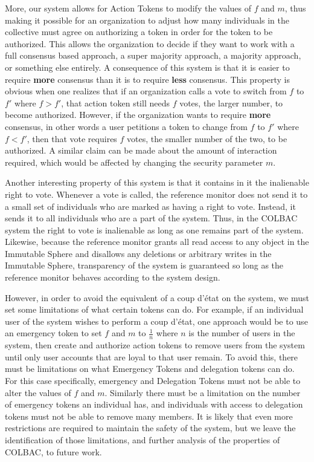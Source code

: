 More, our system allows for Action Tokens to modify the values of $f$ and $m$,
thus making it possible for an organization to adjust how many individuals in
the collective must agree on authorizing a token in order for the token to be
authorized. This allows the organization to decide if they want to work with
a full consensus based approach, a super majority approach, a majority approach,
or something else entirely. A consequence of this system is that it is easier to
require \textbf{more} consensus than it is to require \textbf{less} consensus.
This property is obvious when one realizes that if an organization calls a vote
to switch from $f$ to $f'$ where $f > f'$, that action token still needs $f$
votes, the larger number, to become authorized. However, if the organization
wants to require \textbf{more} consensus, in other words a user petitions a
token to change from $f$ to $f'$ where $f < f'$, then that vote requires $f$
votes, the smaller number of the two, to be authorized. A similar claim can be
made about the amount of interaction required, which would be affected by
changing the security parameter $m$.

Another interesting property of this system is that it contains in it the
inalienable right to vote. Whenever a vote is called, the reference monitor does
not send it to a small set of individuals who are marked as having a right to
vote. Instead, it sends it to all individuals who are a part of the system.
Thus, in the COLBAC system the right to vote is inalienable as long as one
remains part of the system. Likewise, because the reference monitor grants all
read access to any object in the Immutable Sphere and disallows any deletions or
arbitrary writes in the Immutable Sphere, transparency of the system is
guaranteed so long as the reference monitor behaves according to the system
design.

However, in order to avoid the equivalent of a coup d'\'etat on the system, we
must set some limitations of what certain tokens can do. For example, if an 
individual user of the system wishes to perform a coup d'\'etat, one approach
would be to use an emergency token to set $f$ and $m$ to $\frac{1}{n}$ where $n$
is the number of users in the system, then create and authorize action tokens to
remove users from the system until only user accounts that are loyal to that
user remain. To avoid this, there must be limitations on what Emergency Tokens
and delegation tokens can do. For this case specifically, emergency and
Delegation Tokens must not be able to alter the values of $f$ and $m$. Similarly
there must be a limitation on the number of emergency tokens an individual has,
and individuals with access to delegation tokens must not be able to remove many
members. It is likely that even more restrictions are required to maintain the
safety of the system, but we leave the identification of those limitations, and
further analysis of the properties of COLBAC, to future work.


